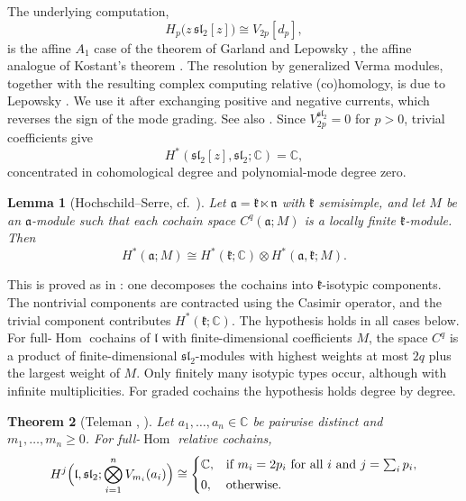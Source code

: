\documentclass[11pt]{amsart}
\numberwithin{equation}{section}
\newtheorem{theorem}{Theorem}[section]
\newtheorem{lemma}[theorem]{Lemma}
\theoremstyle{definition}
\theoremstyle{remark}
\newcommand{\C}{\mathbb{C}}
\newcommand{\sltwo}{\mathfrak{sl}_2}
\newcommand{\lie}{\mathfrak{l}}
\newcommand{\Hom}{\operatorname{Hom}}
\begin{document}
The underlying computation,
\begin{equation}\label{eq:GL}
H_p\bigl(z\,\sltwo[z]\bigr)\cong V_{2p}[d_p],
\end{equation}
is the affine $A_1$ case of the theorem of Garland and Lepowsky \cite{GL76}, the affine analogue of Kostant's theorem \cite{Kos61}. The resolution by generalized Verma modules, together with the resulting complex computing relative (co)homology, is due to Lepowsky \cite[Proposition~5.3, Corollary~5.4 and Theorem~5.5]{Lep79}. We use it after exchanging positive and negative currents, which reverses the sign of the mode grading. See also \cite{Kum02}. Since $V_{2p}^{\sltwo}=0$ for $p>0$, trivial coefficients give
\begin{equation}\label{eq:trivial}
H^*(\sltwo[z],\sltwo;\C)=\C,
\end{equation}
concentrated in cohomological degree and polynomial-mode degree zero.

\begin{lemma}[{Hochschild--Serre, cf.\ \cite{HS53}}]\label{lem:HS}
Let $\mathfrak a=\mathfrak k\ltimes\mathfrak n$ with $\mathfrak k$ semisimple, and let $M$ be an $\mathfrak a$-module such that each cochain space $C^q(\mathfrak a;M)$ is a locally finite $\mathfrak k$-module. Then
\begin{equation}\label{eq:HS}
H^*(\mathfrak a;M)\cong H^*(\mathfrak k;\C)\otimes H^*(\mathfrak a,\mathfrak k;M).
\end{equation}
\end{lemma}

This is proved as in \cite{HS53}: one decomposes the cochains into $\mathfrak k$-isotypic components. The nontrivial components are contracted using the Casimir operator, and the trivial component contributes $H^*(\mathfrak k;\C)$. The hypothesis holds in all cases below. For full-$\Hom$ cochains of $\lie$ with finite-dimensional coefficients $M$, the space $C^q$ is a product of finite-dimensional $\sltwo$-modules with highest weights at most $2q$ plus the largest weight of $M$. Only finitely many isotypic types occur, although with infinite multiplicities. For graded cochains the hypothesis holds degree by degree.

\begin{theorem}[{Teleman \cite[Theorem~0]{Tel95}, \cite[Theorem~3.1]{Tel96}}]\label{thm:eval}
Let $a_1,\dots,a_n\in\C$ be pairwise distinct and $m_1,\dots,m_n\ge0$. For full-$\Hom$ relative cochains,
\begin{equation}\label{eq:Teleman}
H^j\Bigl(\lie,\sltwo;\bigotimes_{i=1}^nV_{m_i}(a_i)\Bigr)\cong
\begin{cases}\C,& \text{if } m_i=2p_i\text{ for all }i\text{ and } j=\sum_ip_i,\\[2pt] 0,&\text{otherwise.}\end{cases}
\end{equation}
\end{theorem}
\end{document}
